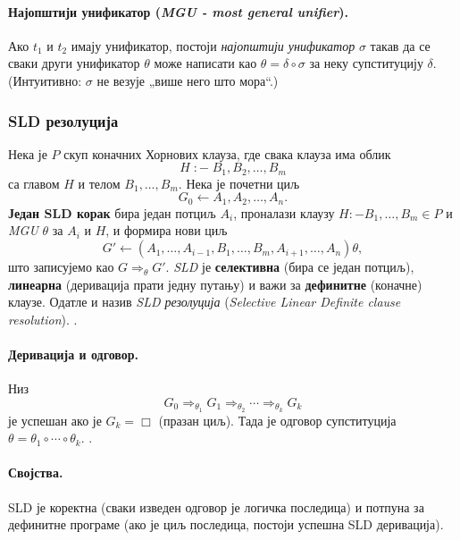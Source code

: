 \paragraph{Најопштији унификатор (\textit{MGU - most general unifier}).}
Ако $t_1$ и $t_2$ имају унификатор, постоји \emph{најопштији унификатор} $\sigma$ такав да се сваки други унификатор $\theta$ може написати као $\theta = \delta \circ \sigma$ за неку супституцију $\delta$. (Интуитивно: $\sigma$ не везује „више него што мора“.) 

\subsubsection{SLD резолуција}
Нека је $P$ скуп коначних Хорнових клауза, где свака клауза има облик
\[
H \; :- \; B_1, B_2, \dots, B_m
\]
са главом $H$ и телом $B_1, \dots, B_m$. Нека је почетни циљ
\[
G_0 \leftarrow A_1, A_2, \dots, A_n.
\]
\textbf{Један SLD корак} бира један потциљ $A_i$, проналази клаузу $H :- B_1, \dots, B_m \in P$ и \emph{MGU} $\theta$ за $A_i$ и $H$, и формира нови циљ
\[
G' \leftarrow (A_1, \dots, A_{i-1}, B_1, \dots, B_m, A_{i+1}, \dots, A_n)\theta,
\]
што записујемо као $G \Rightarrow_{\theta} G'$.
\emph{SLD} је \textbf{селективна} (бира се један потциљ), \textbf{линеарна} (деривација прати једну путању) и важи за \textbf{дефинитне} (коначне) клаузе. Одатле и назив \emph{SLD резолуција} (\emph{Selective Linear Definite clause resolution}). \cite{janii_2004_matematika}.

\paragraph{Деривација и одговор.}
Низ
\[
G_0 \Rightarrow_{\theta_1} G_1 \Rightarrow_{\theta_2} \cdots \Rightarrow_{\theta_k} G_k
\]
је успешан ако је $G_k=\Box$ (празан циљ). Тада је одговор супституција $\theta = \theta_1 \circ \cdots \circ \theta_k$. \cite{janii_2004_matematika}.

\paragraph{Својства.}
SLD је коректна (сваки изведен одговор је логичка последица) и потпуна за дефинитне програме (ако је циљ последица, постоји успешна SLD деривација).

\begin{table}[H]
\centering
{}
\caption{Поређење унификације и SLD резолуције.}
\label{table:unification_vs_sld}
\end{table}


